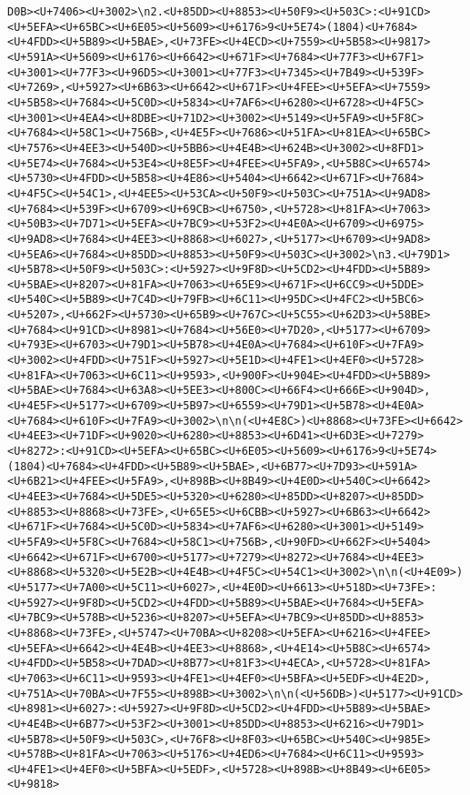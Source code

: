 \documentclass[
]{article}
\begin{document}
\begin{verbatim}
D0B><U+7406><U+3002>\n2.<U+85DD><U+8853><U+50F9><U+503C>:<U+91CD><U+5EFA><U+65BC><U+6E05><U+5609><U+6176>9<U+5E74>(1804)<U+7684><U+4FDD><U+5B89><U+5BAE>,<U+73FE><U+4ECD><U+7559><U+5B58><U+9817><U+591A><U+5609><U+6176><U+6642><U+671F><U+7684><U+77F3><U+67F1><U+3001><U+77F3><U+96D5><U+3001><U+77F3><U+7345><U+7B49><U+539F><U+7269>,<U+5927><U+6B63><U+6642><U+671F><U+4FEE><U+5EFA><U+7559><U+5B58><U+7684><U+5C0D><U+5834><U+7AF6><U+6280><U+6728><U+4F5C><U+3001><U+4EA4><U+8DBE><U+71D2><U+3002><U+5149><U+5FA9><U+5F8C><U+7684><U+58C1><U+756B>,<U+4E5F><U+7686><U+51FA><U+81EA><U+65BC><U+7576><U+4EE3><U+540D><U+5BB6><U+4E4B><U+624B><U+3002><U+8FD1><U+5E74><U+7684><U+53E4><U+8E5F><U+4FEE><U+5FA9>,<U+5B8C><U+6574><U+5730><U+4FDD><U+5B58><U+4E86><U+5404><U+6642><U+671F><U+7684><U+4F5C><U+54C1>,<U+4EE5><U+53CA><U+50F9><U+503C><U+751A><U+9AD8><U+7684><U+539F><U+6709><U+69CB><U+6750>,<U+5728><U+81FA><U+7063><U+50B3><U+7D71><U+5EFA><U+7BC9><U+53F2><U+4E0A><U+6709><U+6975><U+9AD8><U+7684><U+4EE3><U+8868><U+6027>,<U+5177><U+6709><U+9AD8><U+5EA6><U+7684><U+85DD><U+8853><U+50F9><U+503C><U+3002>\n3.<U+79D1><U+5B78><U+50F9><U+503C>:<U+5927><U+9F8D><U+5CD2><U+4FDD><U+5B89><U+5BAE><U+8207><U+81FA><U+7063><U+65E9><U+671F><U+6CC9><U+5DDE><U+540C><U+5B89><U+7C4D><U+79FB><U+6C11><U+95DC><U+4FC2><U+5BC6><U+5207>,<U+662F><U+5730><U+65B9><U+767C><U+5C55><U+62D3><U+58BE><U+7684><U+91CD><U+8981><U+7684><U+56E0><U+7D20>,<U+5177><U+6709><U+793E><U+6703><U+79D1><U+5B78><U+4E0A><U+7684><U+610F><U+7FA9><U+3002><U+4FDD><U+751F><U+5927><U+5E1D><U+4FE1><U+4EF0><U+5728><U+81FA><U+7063><U+6C11><U+9593>,<U+900F><U+904E><U+4FDD><U+5B89><U+5BAE><U+7684><U+63A8><U+5EE3><U+800C><U+66F4><U+666E><U+904D>,<U+4E5F><U+5177><U+6709><U+5B97><U+6559><U+79D1><U+5B78><U+4E0A><U+7684><U+610F><U+7FA9><U+3002>\n\n(<U+4E8C>)<U+8868><U+73FE><U+6642><U+4EE3><U+71DF><U+9020><U+6280><U+8853><U+6D41><U+6D3E><U+7279><U+8272>:<U+91CD><U+5EFA><U+65BC><U+6E05><U+5609><U+6176>9<U+5E74>(1804)<U+7684><U+4FDD><U+5B89><U+5BAE>,<U+6B77><U+7D93><U+591A><U+6B21><U+4FEE><U+5FA9>,<U+898B><U+8B49><U+4E0D><U+540C><U+6642><U+4EE3><U+7684><U+5DE5><U+5320><U+6280><U+85DD><U+8207><U+85DD><U+8853><U+8868><U+73FE>,<U+65E5><U+6CBB><U+5927><U+6B63><U+6642><U+671F><U+7684><U+5C0D><U+5834><U+7AF6><U+6280><U+3001><U+5149><U+5FA9><U+5F8C><U+7684><U+58C1><U+756B>,<U+90FD><U+662F><U+5404><U+6642><U+671F><U+6700><U+5177><U+7279><U+8272><U+7684><U+4EE3><U+8868><U+5320><U+5E2B><U+4E4B><U+4F5C><U+54C1><U+3002>\n\n(<U+4E09>)<U+5177><U+7A00><U+5C11><U+6027>,<U+4E0D><U+6613><U+518D><U+73FE>:<U+5927><U+9F8D><U+5CD2><U+4FDD><U+5B89><U+5BAE><U+7684><U+5EFA><U+7BC9><U+578B><U+5236><U+8207><U+5EFA><U+7BC9><U+85DD><U+8853><U+8868><U+73FE>,<U+5747><U+70BA><U+8208><U+5EFA><U+6216><U+4FEE><U+5EFA><U+6642><U+4E4B><U+4EE3><U+8868>,<U+4E14><U+5B8C><U+6574><U+4FDD><U+5B58><U+7DAD><U+8B77><U+81F3><U+4ECA>,<U+5728><U+81FA><U+7063><U+6C11><U+9593><U+4FE1><U+4EF0><U+5BFA><U+5EDF><U+4E2D>,<U+751A><U+70BA><U+7F55><U+898B><U+3002>\n\n(<U+56DB>)<U+5177><U+91CD><U+8981><U+6027>:<U+5927><U+9F8D><U+5CD2><U+4FDD><U+5B89><U+5BAE><U+4E4B><U+6B77><U+53F2><U+3001><U+85DD><U+8853><U+6216><U+79D1><U+5B78><U+50F9><U+503C>,<U+76F8><U+8F03><U+65BC><U+540C><U+985E><U+578B><U+81FA><U+7063><U+5176><U+4ED6><U+7684><U+6C11><U+9593><U+4FE1><U+4EF0><U+5BFA><U+5EDF>,<U+5728><U+898B><U+8B49><U+6E05><U+9818>
\end{verbatim}
\end{document}
